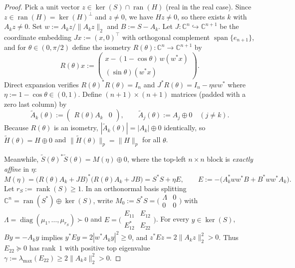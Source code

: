 \documentclass[10pt,letterpaper]{article}
\newcommand{\C}{\mathbb{C}}
\newcommand{\ran}{\operatorname{ran}}
\newcommand{\rank}{\operatorname{rank}}
\newcommand{\diag}{\operatorname{diag}}
\begin{document}
\begin{proof}
Pick a unit vector $z \in \ker(S) \cap \ran(H)$ (real in the real case). Since $z \in \ran(H) = \ker(H)^\perp$ and $z \neq 0$, we have $Hz \neq 0$, so there exists $k$ with $A_k z \neq 0$. Set $w := A_k z / \|A_k z\|_2$ and $B := S - A_k$. Let $J : \C^n \hookrightarrow \C^{n+1}$ be the coordinate embedding $Jx := (x, 0)^\top$ with orthogonal complement $\operatorname{span}\{e_{n+1}\}$, and for $\theta \in (0, \pi/2)$ define the isometry $R(\theta) : \C^n \to \C^{n+1}$ by
\[
  R(\theta)x := \begin{pmatrix} x - (1 - \cos\theta)\,w(w^* x) \\ (\sin\theta)(w^* x) \end{pmatrix}.
\]
Direct expansion verifies $R(\theta)^* R(\theta) = I_n$ and $J^* R(\theta) = I_n - \eta w w^*$ where $\eta := 1 - \cos\theta \in (0,1)$. Define $(n+1)\times(n+1)$ matrices (padded with a zero last column) by
\[
  \widetilde{A}_k(\theta) := \begin{pmatrix} R(\theta) A_k & 0 \end{pmatrix}, \qquad
  \widetilde{A}_j(\theta) := A_j \oplus 0 \quad (j \neq k).
\]
Because $R(\theta)$ is an isometry, $|\widetilde{A}_k(\theta)| = |A_k| \oplus 0$ identically, so $\widetilde{H}(\theta) = H \oplus 0$ and $\|\widetilde{H}(\theta)\|_p = \|H\|_p$ for all $\theta$.

Meanwhile, $\widetilde{S}(\theta)^* \widetilde{S}(\theta) = M(\eta) \oplus 0$, where the top-left $n\times n$ block is \emph{exactly affine} in $\eta$:
\[
  M(\eta) = \bigl(R(\theta) A_k + JB\bigr)^*\bigl(R(\theta) A_k + JB\bigr) = S^* S + \eta E,
  \qquad E := -\bigl(A_k^* w w^* B + B^* w w^* A_k\bigr).
\]
Let $r_S := \rank(S) \ge 1$. In an orthonormal basis splitting $\C^n = \ran(S^*) \oplus \ker(S)$, write $M_0 := S^* S = \bigl(\begin{smallmatrix} \Lambda & 0 \\ 0 & 0 \end{smallmatrix}\bigr)$ with $\Lambda = \diag(\mu_1,\dots,\mu_{r_S}) \succ 0$ and $E = \bigl(\begin{smallmatrix} E_{11} & E_{12} \\ E_{12}^* & E_{22} \end{smallmatrix}\bigr)$. For every $y \in \ker(S)$, $By = -A_k y$ implies $y^* E y = 2|w^* A_k y|^2 \ge 0$, and $z^* E z = 2\|A_k z\|_2^2 > 0$. Thus $E_{22} \succeq 0$ has rank~$1$ with positive top eigenvalue $\gamma := \lambda_{\max}(E_{22}) \ge 2\|A_k z\|_2^2 > 0$.


\end{proof}
\end{document}
